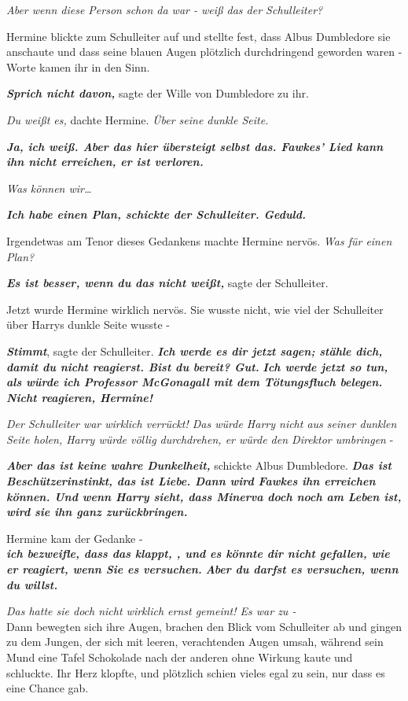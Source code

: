 {\emph{Aber wenn diese Person schon da war - weiß das der Schulleiter?}

Hermine blickte zum Schulleiter auf und stellte fest, dass Albus Dumbledore sie anschaute und dass seine blauen Augen plötzlich durchdringend geworden waren - Worte kamen ihr in den Sinn.

\textbf{\emph{Sprich nicht davon,}} sagte der Wille von Dumbledore zu ihr.

\emph{Du weißt es,} dachte Hermine. \emph{Über seine dunkle Seite.}

\textbf{\emph{Ja, ich weiß. Aber das hier übersteigt selbst das. Fawkes' Lied kann ihn nicht erreichen, er ist verloren.}}

\emph{Was können wir…}

\textbf{\emph{Ich habe einen Plan, schickte der Schulleiter. Geduld.}}

Irgendetwas am Tenor dieses Gedankens machte Hermine nervös. \emph{Was für einen Plan?}

\textbf{\emph{Es ist besser, wenn du das nicht weißt,}} sagte der Schulleiter.

Jetzt wurde Hermine wirklich nervös. Sie wusste nicht, wie viel der Schulleiter über Harrys dunkle Seite wusste -

\textbf{\emph{Stimmt}}, sagte der Schulleiter. \textbf{\emph{Ich werde es dir jetzt sagen; stähle dich, damit du nicht reagierst. Bist du bereit? Gut.}} \textbf{\emph{Ich werde jetzt so tun, als würde ich Professor McGonagall mit dem Tötungsfluch belegen. Nicht reagieren, Hermine!}}

\emph{Der Schulleiter war wirklich verrückt! Das würde Harry nicht aus seiner dunklen Seite holen, Harry würde völlig durchdrehen, er würde den Direktor umbringen} -

\textbf{\emph{Aber das ist keine wahre Dunkelheit,}} schickte Albus Dumbledore. \textbf{\emph{Das ist Beschützerinstinkt, das ist Liebe. Dann wird Fawkes ihn erreichen können. Und wenn Harry sieht, dass Minerva doch noch am Leben ist, wird sie ihn ganz zurückbringen.}}

Hermine kam der Gedanke -\\ \textbf{\emph{ich bezweifle, dass das klappt, , und es könnte dir nicht gefallen, wie er reagiert, wenn Sie es versuchen.}} \textbf{\emph{Aber du darfst es versuchen, wenn du willst.}}

\emph{Das hatte sie doch nicht wirklich ernst gemeint! Es war zu -}\\ Dann bewegten sich ihre Augen, brachen den Blick vom Schulleiter ab und gingen zu dem Jungen, der sich mit leeren, verachtenden Augen umsah, während sein Mund eine Tafel Schokolade nach der anderen ohne Wirkung kaute und schluckte. Ihr Herz klopfte, und plötzlich schien vieles egal zu sein, nur dass es eine Chance gab.

}
